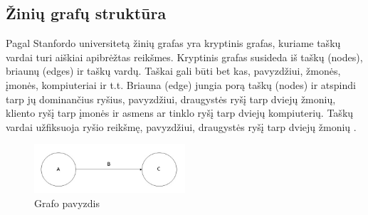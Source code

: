\documentclass{VUMIFPSkursinis}
\begin{document}
\subsection{Žinių grafų struktūra}
Pagal Stanfordo universitetą žinių grafas yra kryptinis grafas, kuriame taškų vardai turi aiškiai apibrėžtas reikšmes. Kryptinis grafas susideda iš taškų (nodes), briaunų (edges) ir taškų vardų. Taškai gali būti bet kas, pavyzdžiui, žmonės, įmonės, kompiuteriai ir t.t. Briauna (edge) jungia porą taškų (nodes) ir atspindi tarp jų dominančius ryšius, pavyzdžiui, draugystės ryšį tarp dviejų žmonių, kliento ryšį tarp įmonės ir asmens ar tinklo ryšį tarp dviejų kompiuterių. Taškų vardai užfiksuoja ryšio reikšmę, pavyzdžiui, draugystės ryšį tarp dviejų žmonių \cite{stanford_what_2021}.

\begin{figure}[htbp]
  \centering
  \includegraphics[width=0.5\textwidth]{img/triple.jpg}
  \caption{Grafo pavyzdis \cite{stanford_image}}
  \label{fig:triple}
\end{figure}
\pagebreak
\end{document}
